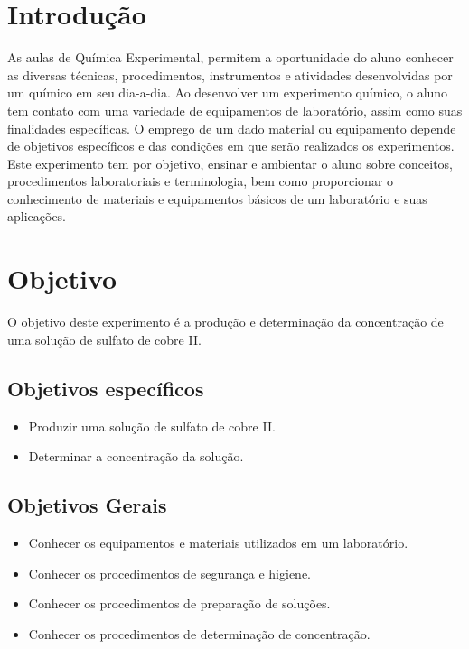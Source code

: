 \documentclass[a4paper, 11pt]{article}
\begin{document}
\newpage
\section{Introdução}\label{sec:introducao}

    \indent As aulas de Química Experimental, permitem a oportunidade do aluno conhecer as diversas técnicas, procedimentos, instrumentos e atividades desenvolvidas por um químico em seu dia-a-dia.
    Ao desenvolver um experimento químico, o aluno tem contato com uma variedade de equipamentos de laboratório, assim como suas finalidades específicas.
    O emprego de um dado material ou equipamento depende de objetivos específicos e das condições em que serão realizados os experimentos.\\
    \indent Este experimento tem por objetivo, ensinar e ambientar o aluno sobre conceitos, procedimentos laboratoriais e terminologia, bem como proporcionar o conhecimento de materiais e equipamentos básicos de um laboratório e suas aplicações.

\section{Objetivo}\label{sec:objetivo}

    \indent O objetivo deste experimento é a produção e determinação da concentração de uma solução de sulfato de cobre II\@.

    \subsection*{Objetivos específicos}\label{sec:objetivos_especificos}

        \begin{itemize}
            \item Produzir uma solução de sulfato de cobre II\@.
            \item Determinar a concentração da solução\@.
        \end{itemize}

    \subsection*{Objetivos Gerais}\label{sec:objetivos_gerais}

        \begin{itemize}
            \item Conhecer os equipamentos e materiais utilizados em um laboratório\@.
            \item Conhecer os procedimentos de segurança e higiene\@.
            \item Conhecer os procedimentos de preparação de soluções\@.
            \item Conhecer os procedimentos de determinação de concentração\@.
        \end{itemize}
\newpage
\end{document}
